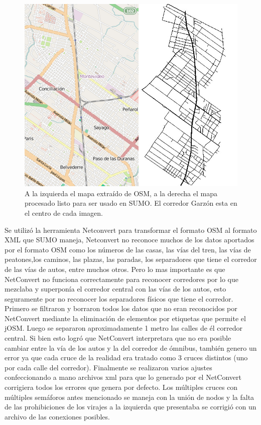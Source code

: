 \begin{figure}[H]
	\centering
	\includegraphics[width=0.9\linewidth]{Figures/mapa_osm_sumo}
	\caption{A la izquierda el mapa extraído de OSM, a la derecha el mapa procesado listo para ser usado en SUMO. El corredor Garzón esta en el centro de cada imagen.}
	\label{fig:mapa_osm_sumo}
\end{figure}

Se utilizó la herramienta Netconvert para transformar el formato OSM al formato XML que SUMO maneja, Netconvert no reconoce muchos de los datos aportados por el formato OSM como los números de las casas, las vías del tren, las vías de peatones,los caminos, las plazas, las paradas, los separadores que tiene el corredor de las vías de autos, entre muchos otros. Pero lo mas importante es que NetConvert no funciona correctamente para reconocer corredores por lo que mezclaba y superponía el corredor central con las vías de los autos, esto seguramente por no reconocer los separadores físicos que tiene el corredor. 
Primero se filtraron y borraron todos los datos que no eran reconocidos por NetConvert mediante la eliminación de elementos por etiquetas que permite el jOSM. Luego se separaron aproximadamente 1 metro las calles de él corredor central. Si bien esto logró que NetConvert interpretara que no era posible cambiar entre la vía de los autos y la del corredor de ómnibus, también genero un error ya que cada cruce de la realidad era tratado como 3 cruces distintos (uno por cada calle del corredor).
Finalmente se realizaron varios ajustes confeccionando a mano archivos xml para que lo generado por el NetConvert corrigiera todos los errores que genera por defecto. Los múltiples cruces con múltiples semáforos antes mencionado se maneja con la unión de nodos y la falta de las prohibiciones de los virajes a la izquierda que presentaba se corrigió con un archivo de las conexiones posibles.

